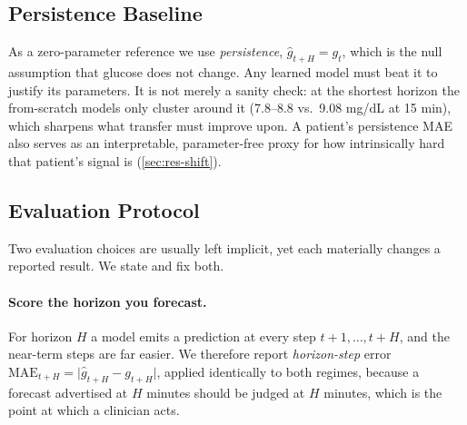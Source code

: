 \documentclass[conference]{IEEEtran}
\begin{document}
\subsection{Persistence Baseline}
\label{sec:baseline}
As a zero-parameter reference we use \emph{persistence}, $\hat{g}_{t+H}=g_t$, which
is the null assumption that glucose does not change. Any learned model must beat it
to justify its parameters. It is not merely a sanity check: at the shortest horizon
the from-scratch models only cluster around it (7.8--8.8 vs.\ 9.08 mg/dL at 15 min),
which sharpens what transfer must improve upon. A patient's persistence MAE also
serves as an interpretable, parameter-free proxy for how intrinsically hard that
patient's signal is (\ref{sec:res-shift}).

\subsection{Evaluation Protocol}
\label{sec:protocol}
Two evaluation choices are usually left implicit, yet each materially changes a
reported result. We state and fix both.

\paragraph{Score the horizon you forecast.}
For horizon $H$ a model emits a prediction at every step $t{+}1,\dots,t{+}H$, and
the near-term steps are far easier. We therefore report \emph{horizon-step} error
$\text{MAE}_{t+H}=\lvert\hat{g}_{t+H}-g_{t+H}\rvert$, applied identically to both
regimes, because a forecast advertised at $H$ minutes should be judged at $H$
minutes, which is the point at which a clinician acts.
\end{document}
